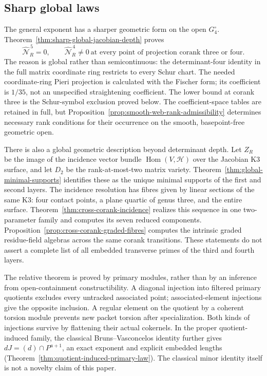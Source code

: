 \subsection{Sharp global laws}

The general exponent has a sharper geometric form on the open
\(G_4^\circ\).  Theorem~\ref{thm:sharp-global-jacobian-depth} proves
\[
 \widehat{\mathcal N}_R^{\,5}=0,
 \qquad \widehat{\mathcal N}_R^{\,4}\ne0
 \ \text{at every point of projection corank three or four}.
\]
The reason is global rather than semicontinuous: the determinant-four
identity in the full matrix coordinate ring restricts to every Schur
chart.  The needed coordinate-ring Pieri projection is calculated with
the Fischer form; its coefficient is \(1/35\), not an unspecified
straightening coefficient.  The lower bound at corank three is the
Schur-symbol exclusion proved below.  The coefficient-space tables
are retained in full, but Proposition~\ref{prop:smooth-web-rank-admissibility}
determines necessary rank conditions for their occurrence on the
smooth, basepoint-free geometric open.

There is also a global geometric description beyond determinant depth.
Let \(Z_R\) be the image of the incidence vector bundle
\(\operatorname{Hom}(V,\mathcal H)\) over the Jacobian K3 surface,
and let \(D_2\) be the rank-at-most-two matrix variety.
Theorem~\ref{thm:global-minimal-supports} identifies these as the
unique minimal supports of the first and second layers.  The incidence
resolution has fibres given by linear sections of the same K3:
four contact points, a plane quartic of genus three, and the entire
surface.  Theorem~\ref{thm:cross-corank-incidence} realizes this
sequence in one two-parameter family and computes its seven reduced
components.  Proposition~\ref{prop:cross-corank-graded-fibres}
computes the intrinsic graded residue-field algebras across the same
corank transitions.  These statements do not assert a complete list
of all embedded transverse primes of the third and fourth layers.

The relative theorem is proved by primary modules, rather than by an
inference from open-containment constructibility.  A diagonal
injection into filtered primary quotients excludes every untracked
associated point; associated-element injections give the opposite
inclusion.  A regular element on the quotient by a coherent torsion
module prevents new packet torsion after specialization.  Both kinds
of injections survive by flattening their actual cokernels.
In the proper quotient-induced family, the classical
Bruns--Vasconcelos identity \cite{BrunsVasconcelos} further gives
\(dJ=(d)\cap P^{a+1}\), an exact exponent and explicit embedded
lengths (Theorem~\ref{thm:quotient-induced-primary-law}).  The
classical minor identity itself is not a novelty claim of this paper.

